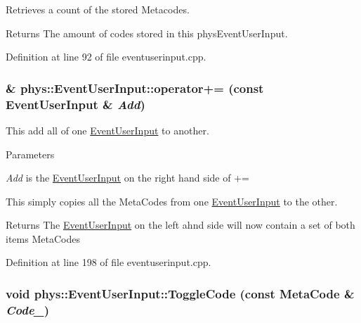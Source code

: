 Retrieves a count of the stored Metacodes. 

\begin{DoxyReturn}{Returns}
The amount of codes stored in this physEventUserInput. 
\end{DoxyReturn}


Definition at line 92 of file eventuserinput.cpp.

\hypertarget{classphys_1_1EventUserInput_a1d6895e1b3814c1a63f5605b88ba85e5}{
\subsubsection[{operator+=}]{ \& phys::EventUserInput::operator+= (const {\bf EventUserInput} \& {\em Add})}}
\label{d7/df5/classphys_1_1EventUserInput_a1d6895e1b3814c1a63f5605b88ba85e5}


This add all of one \hyperlink{classphys_1_1EventUserInput}{EventUserInput} to another. 


\begin{DoxyParams}{Parameters}
\item[{\em Add}]is the \hyperlink{classphys_1_1EventUserInput}{EventUserInput} on the right hand side of +=\end{DoxyParams}
This simply copies all the MetaCodes from one \hyperlink{classphys_1_1EventUserInput}{EventUserInput} to the other. \begin{DoxyReturn}{Returns}
The \hyperlink{classphys_1_1EventUserInput}{EventUserInput} on the left ahnd side will now contain a set of both items MetaCodes 
\end{DoxyReturn}


Definition at line 198 of file eventuserinput.cpp.

\hypertarget{classphys_1_1EventUserInput_adf603505c43162cf9331a486d5832f75}{
\subsubsection[{ToggleCode}]{\setlength{\rightskip}{0pt plus 5cm}void phys::EventUserInput::ToggleCode (const {\bf MetaCode} \& {\em Code\_\-})}}
\label{d7/df5/classphys_1_1EventUserInput_adf603505c43162cf9331a486d5832f75}


